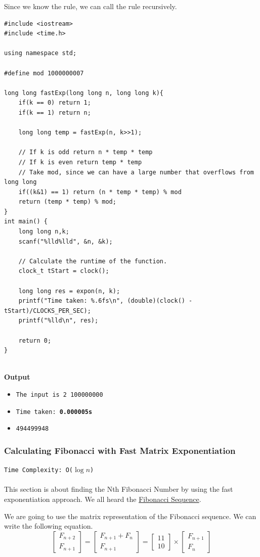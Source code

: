 \documentclass[12pt]{article}
\begin{document}
Since we know the rule, we can call the rule recursively.
\begin{verbatim}
#include <iostream>
#include <time.h>

using namespace std;

#define mod 1000000007

long long fastExp(long long n, long long k){
    if(k == 0) return 1;
    if(k == 1) return n;
    
    long long temp = fastExp(n, k>>1);
    
    // If k is odd return n * temp * temp
    // If k is even return temp * temp
    // Take mod, since we can have a large number that overflows from long long
    if((k&1) == 1) return (n * temp * temp) % mod
    return (temp * temp) % mod;
}
int main() {
    long long n,k;
    scanf("%lld%lld", &n, &k);
    
    // Calculate the runtime of the function.
    clock_t tStart = clock();
    
    long long res = expon(n, k);
    printf("Time taken: %.6fs\n", (double)(clock() - tStart)/CLOCKS_PER_SEC);
    printf("%lld\n", res);
    
    return 0;
}


\end{verbatim}
\textbf{Output}

\begin{itemize}
  \item \texttt{The input is 2 100000000} 
  \item \texttt{Time taken: \textbf{0.000005s}} 
  \item \texttt{494499948}
\end{itemize}

\subsubsection{Calculating Fibonacci with Fast Matrix Exponentiation}
\texttt{Time Complexity: O($\log{n}$) } \\ \\
This section is about finding the Nth Fibonacci Number by using the fast exponentiation approach. We all heard the \href{https://en.wikipedia.org/wiki/Fibonacci_number}{Fibonacci Sequence}. 

We are going to use the matrix representation of the Fibonacci sequence. We can write the following equation. \cite{fibonaccimatrix}
\[
\begin{bmatrix}
    F_{n+2} \\
    F_{n+1}
\end{bmatrix}
=
\begin{bmatrix}
    F_{n+1} + F_{n}\\
    F_{n+1}
\end{bmatrix}
=
\begin{bmatrix}
    1 1  \\
    1 0
\end{bmatrix}
\times
\begin{bmatrix}
    F_{n+1} \\
    F_{n}
\end{bmatrix}
\]
\end{document}
